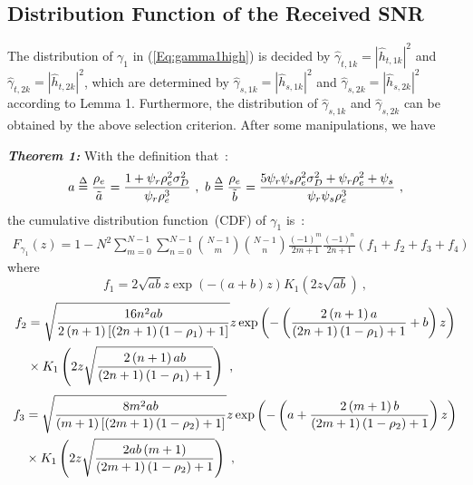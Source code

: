 \documentclass[onecolumn,letterpaper,11pt,draftclsnofoot]{IEEEtran}
\begin{document}
\subsection{Distribution Function of the Received SNR}

The distribution of $\gamma_1$ in (\ref{Eq:gamma1high}) is decided
by $\hat \gamma_{t,1k}=\left| {\hat h_{t,1k} } \right|^2$ and $\hat
\gamma_{t,2k}=\left| {\hat h_{t,2k} } \right|^2$, which are
determined by $\hat \gamma_{s,1k}=\left| {\hat h_{s,1k} } \right|^2$
and $\hat \gamma_{s,2k}=\left| {\hat h_{s,2k} } \right|^2$ according
to Lemma 1. Furthermore, the distribution of $\hat \gamma_{s,1k}$
and $\hat \gamma_{s,2k}$ can be obtained by the above selection
criterion. After some manipulations, we have


\textbf{\emph{Theorem 1:}} With the definition that~:
\begin{align}\label{Eq:a}
a \buildrel \Delta \over = \frac{{\rho _e }}{{\tilde a}} = \frac{{1
+ \psi _r \rho _e^2 \sigma _D^2 }}{{\psi _r \rho _e^3 }}~,~ b
\buildrel \Delta \over = \frac{{\rho _e }}{{\tilde b}} =
\frac{{5\psi _r \psi _s \rho _e^2 \sigma _D^2  + \psi _r \rho _e^2 +
\psi _s }}{{\psi _r \psi _s \rho _e^3 }}~,
\end {align}
the cumulative distribution function~(CDF) of  $\gamma_1$ is~:
\begin{align}\label{Eq:cdf}
F_{\gamma _1 } \left(z\right) = 1 - N^2\sum\limits_{m = 0}^{N - 1}
{\sum\limits_{n = 0}^{N - 1} \binom{N-1}{m}} \binom{N-1}{n}
\frac{\left(-1\right)^m}{{2m + 1}}\frac{\left(-1\right)^n}{{2n + 1}}
\left(f_1 + f_2 +f_3 + f_4 \right) ~
\end{align}
where
\begin{equation}
f_1  = 2\sqrt {ab} z\exp \left( - \left(a + b\right)z\right)K_1
\left(2z\sqrt {ab} \right)~,
\end{equation}
\begin{align}
f_2 &= \sqrt {\frac{{16n^2 ab}}{{2\left(n + 1\right)\left[\left(2n +
1\right)\left(1 - \rho _1 \right) + 1\right]}}} z\exp \left( -
\left(\frac{{2\left(n + 1\right)a}}{{\left(2n + 1\right)\left(1 -
\rho _1 \right) + 1}}+b\right)z\right)\\\notag &\times K_1
\left(2z\sqrt {\frac{{2\left(n + 1\right)ab}}{{\left(2n +
1\right)\left(1 - \rho _1 \right) + 1}}}\right)~,
\end{align}
\begin{align}
f_3  &= \sqrt {\frac{{8m^2 ab}}{{\left(m + 1\right)\left[\left(2m +
1\right)\left(1 - \rho _2 \right) + 1\right]}}} z\exp \left( -
\left(a + \frac{{2\left(m + 1\right)b}}{{\left(2m + 1\right)\left(1
- \rho _2 \right) + 1}}\right)z\right)\\\notag &\times K_1
\left(2z\sqrt {\frac{{2ab\left(m + 1\right)}}{{\left(2m +
1\right)\left(1 - \rho _2 \right) + 1}}}\right)~,
\end{align}
\end{document}

